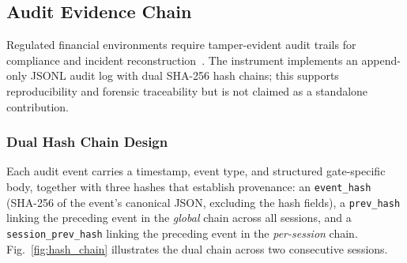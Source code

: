 \documentclass[journal]{IEEEtran}
\begin{document}
\subsection{Audit Evidence Chain}
\label{Sect:Audit_Chain}

Regulated financial environments require tamper-evident audit trails for compliance and incident reconstruction~\cite{nist_ai_rmf}. The instrument implements an append-only JSONL audit log with dual SHA-256 hash chains; this supports reproducibility and forensic traceability but is not claimed as a standalone contribution.

\subsubsection{Dual Hash Chain Design}

Each audit event carries a timestamp, event type, and structured gate-specific body, together with three hashes that establish provenance: an \texttt{event\_hash} (SHA-256 of the event's canonical JSON, excluding the hash fields), a \texttt{prev\_hash} linking the preceding event in the \textit{global} chain across all sessions, and a \texttt{session\_prev\_hash} linking the preceding event in the \textit{per-session} chain. Fig.~\ref{fig:hash_chain} illustrates the dual chain across two consecutive sessions.
\end{document}
